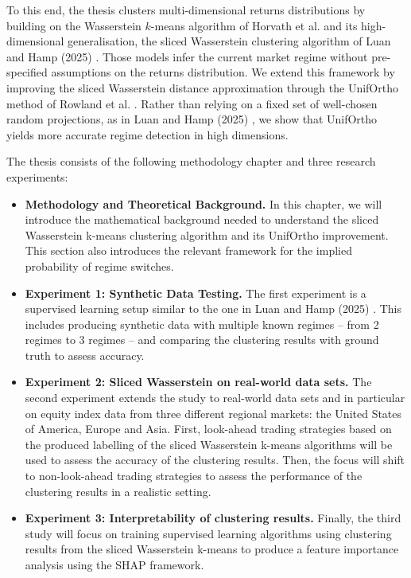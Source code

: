 \documentclass[12pt,a4paper]{report}
\begin{document}
To this end, the thesis clusters multi-dimensional returns distributions by building
on the Wasserstein $k$-means algorithm of Horvath et al. \cite{HorvathEtAl2024} and
its high-dimensional generalisation, the sliced Wasserstein clustering algorithm of
Luan and Hamp (2025) \cite{LuanHamp2025}. Those models infer the current market regime
without pre-specified assumptions on the returns distribution. We extend this
framework by improving the sliced Wasserstein distance approximation through the
UnifOrtho method of Rowland et al. \cite{RowlandEtAl2019}. Rather than relying on a
fixed set of well-chosen random projections, as in Luan and Hamp (2025) \cite{LuanHamp2025}, we show that
UnifOrtho yields more accurate regime detection in high dimensions.

The thesis consists of the following methodology chapter and three research experiments:
\begin{itemize}
  \item \textbf{Methodology and Theoretical Background.}
  In this chapter, we will introduce the mathematical background needed to understand the sliced Wasserstein k-means clustering algorithm and its UnifOrtho improvement.
    This section also introduces the relevant framework for the implied probability of regime switches.

  \item \textbf{Experiment 1: Synthetic Data Testing.}
  The first experiment is a supervised learning setup similar to the one in Luan and Hamp (2025) \cite{LuanHamp2025}.
  This includes producing synthetic data with multiple known regimes -- from 2 regimes to 3 regimes -- and comparing the clustering results with 
  ground truth to assess accuracy. 
  
  \item \textbf{Experiment 2: Sliced Wasserstein on real-world data sets.}
  The second experiment extends the study to real-world data sets and in particular on equity index data from three different regional markets: the United States of America, Europe and Asia. 
  First, look-ahead trading strategies based on the produced labelling of the sliced Wasserstein k-means algorithms will be used to assess the accuracy of the clustering results. 
  Then, the focus will shift to non-look-ahead trading strategies to assess the performance of the clustering results in a realistic setting. 

  \item \textbf{Experiment 3: Interpretability of clustering results.}
  Finally, the third study will focus on training supervised learning algorithms using clustering results from the sliced Wasserstein k-means to 
  produce a feature importance analysis using the SHAP framework.   
\end{itemize}
\end{document}
